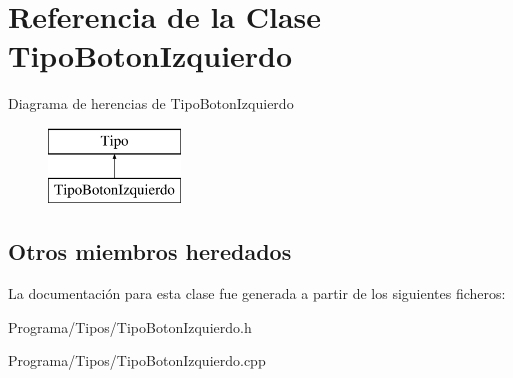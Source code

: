 \hypertarget{class_tipo_boton_izquierdo}{\section{Referencia de la Clase Tipo\-Boton\-Izquierdo}
\label{class_tipo_boton_izquierdo}
}
Diagrama de herencias de Tipo\-Boton\-Izquierdo\begin{figure}[H]
\begin{center}
\leavevmode
\includegraphics[height=2.000000cm]{class_tipo_boton_izquierdo}
\end{center}
\end{figure}
\subsection*{Otros miembros heredados}


La documentación para esta clase fue generada a partir de los siguientes ficheros\-:\begin{DoxyCompactItemize}
\item 
Programa/\-Tipos/Tipo\-Boton\-Izquierdo.\-h\item 
Programa/\-Tipos/Tipo\-Boton\-Izquierdo.\-cpp\end{DoxyCompactItemize}
